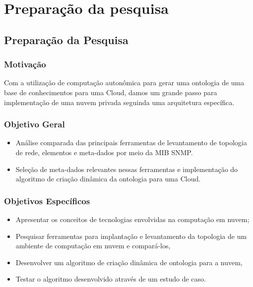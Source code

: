 
\part{Preparação da pesquisa}


\chapter{Preparação da Pesquisa}

\section{Motivação}

Com a utilização de computação autonômica para gerar uma ontologia de uma base
de conhecimentos para uma  Cloud, damos um grande passo para implementação de
uma nuvem privada seguinda uma arquitetura específica.

\section{Objetivo Geral}
\label{introducao:objetivos}
\begin{itemize}
\setlength{\itemsep}{1pt}
\setlength{\parskip}{0pt}
\setlength{\parsep}{0pt}
\item Análise comparada das principais ferramentas de levantamento de topologia de
rede, elementos e meta-dados por meio da MIB SNMP.
\item Seleção de meta-dados relevantes nessas ferramentas e implementação do
 algoritmo de criação dinâmica da ontologia para uma Cloud.
\end{itemize}

\section{Objetivos Específicos}
\label{introducao:objetivosespecificos}
\begin{itemize}
\setlength{\itemsep}{1pt}
\setlength{\parskip}{0pt}
\setlength{\parsep}{0pt}
\item Apresentar os conceitos de tecnologias envolvidas na computação em nuvem;
\item Pesquisar ferramentas para implantação e levantamento da topologia de um
ambiente de computação em nuvem e compará-los,
\item Desenvolver um algoritmo de criação dinâmica de ontologia para a nuvem,
\item Testar o algoritmo desenvolvido através de um estudo de caso.
\end{itemize}


